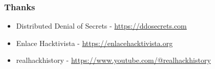 \documentclass[aspectratio=169,usenames,dvipsnames]{beamer}
\begin{document}
\begin{frame}
  \frametitle{Thanks}

  \begin{itemize}
    \item Distributed Denial of Secrets - \url{https://ddosecrets.com}
    \item Enlace Hacktivista - \url{https://enlacehacktivista.org}
    \item realhackhistory - \url{https://www.youtube.com/@realhackhistory}
  \end{itemize}
\end{frame}
\end{document}
